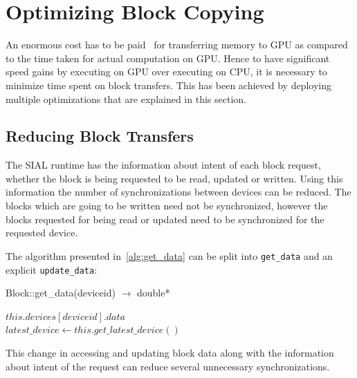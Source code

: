 \section{Optimizing Block Copying}
An enormous cost has to be paid~\cite{Bakkum2010}\cite{memorytransferoverhead}
for transferring memory to GPU as compared to the time taken for actual computation
on GPU. Hence to have significant speed gains by executing on GPU over executing
on CPU, it is necessary to minimize time spent on block transfers. This has been
achieved by deploying multiple optimizations that are explained in this section.

\subsection{Reducing Block Transfers}
The SIAL runtime has the information about intent of each block request, whether
the block is being requested to be read, updated or written. Using this information the
number of synchronizations between devices can be reduced. The blocks which are
going to be written need not be synchronized, however the blocks requested for
being read or updated need to be synchronized for the requested device.

The algorithm presented in~\ref{alg:get_data} can be split into
\texttt{get\_data} and an explicit \texttt{update\_data}:

\begin{algorithm}  {Block::get\_data(deviceid) $\rightarrow$ double*}
  \singlespacing

  \begin{algorithmic}[1]
    \State \Return $this.devices[deviceid].data$
    \EndFunction
    \\
    \State $latest\_device \gets this.get\_latest\_device()$
    \EndIf
    \EndFunction
  \end{algorithmic}
\end{algorithm}

This change in accessing and updating block data along with the information
about intent of the request can reduce several unnecessary synchronizations.

